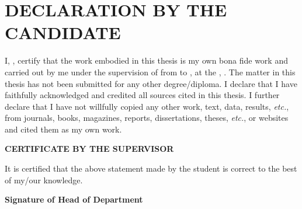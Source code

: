 \chapter*{\centering\normalsize DECLARATION BY THE CANDIDATE}

I, \textbf{\theauthor{}}, certify that the work embodied in this thesis is my own bona fide work and carried out by me under the supervision of \textbf{\supervisor{}} from \textbf{\projectstart{}} to \textbf{\projectend{}}, at the \textbf{\department{}}, \institute{}. The matter in this thesis has not been submitted for any other degree/diploma. I declare that I have faithfully acknowledged and credited all sources cited in this thesis. I further declare that I have not willfully copied any other work, text, data, results, \textit{etc.}, from journals, books, magazines, reports, dissertations, theses, \textit{etc.}, or websites and cited them as my own work.



\vspace{0.5cm}

\textbf{\centering CERTIFICATE BY THE SUPERVISOR\\}

\vspace{0.5cm}

It is certified that the above statement made by the student is correct to the best of my/our
knowledge.



\vfill

{\centering\textbf{Signature of Head of Department
\\}}
